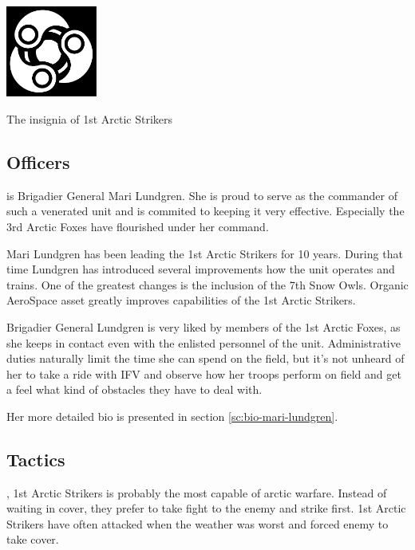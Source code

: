 \documentclass{tufte-book}
\begin{document}
\begin{marginfigure}[0\baselineskip]
  \includegraphics[width=3cm]{triple-yin}
  \caption{The insignia of 1st Arctic Strikers}
  \label{fig:arctic_strikers}
\end{marginfigure}

\subsection{Officers}

 is Brigadier General Mari
Lundgren. She is proud to serve as the commander of such a venerated unit and
is commited to keeping it very effective. Especially the 3rd Arctic
Foxes have flourished under her command.

Mari Lundgren has been leading the 1st Arctic Strikers for 10 years. During
that time Lundgren has introduced several improvements how the unit operates
and trains. One of the greatest changes is the inclusion of the 7th Snow Owls.
Organic AeroSpace asset greatly improves capabilities of the 1st Arctic
Strikers.

Brigadier General Lundgren 
is very liked by members of the 1st Arctic Foxes,
as she keeps in contact even with the enlisted personnel of the unit.
Administrative duties naturally limit the time she can spend on the field,
but it's not unheard of her to take a ride with IFV and observe how her troops
perform on field and get a feel what kind of obstacles they have to deal with.

Her more detailed bio is presented in section \ref{sc:bio-mari-lundgren}.

\subsection{Tactics}

, 1st Arctic Strikers is probably the
most capable of arctic warfare. Instead of waiting in cover, they prefer to
take fight to the enemy and strike first. 1st Arctic Strikers have often
attacked when the weather was worst and forced enemy to take cover.
\end{document}
